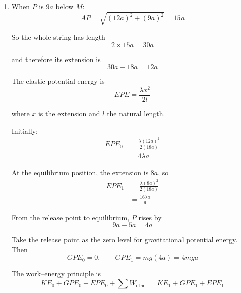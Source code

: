 \documentclass[leqno]{article}
\begin{document}
\begin{enumerate}[
  label=\textbf{\arabic*.},
  leftmargin=*,
  topsep=0pt,
  partopsep=0pt,
  parsep=0pt
]
\begin{djsSolution}
\begin{enumerate}[label=\textbf{(\alph*)}, start=1]
so
\[
AP=\sqrt{(12a)^2+(5a)^2}=13a
\]

Hence the actual length of the whole string is
\[
2\times 13a=26a
\]

so its extension is
\[
26a-18a=8a
\]

The tension is
\[
T=\frac{\lambda x}{l}
\]

where \(x\) is the extension and \(l\) the natural length. The tension \(T\) is the same in each side, and here \(x=8a\) and \(l=18a\), so
\[
T=\frac{\lambda(8a)}{18a}=\frac{4\lambda}{9}
\]

If $\theta$ is the angle each side makes with the horizontal, then from the $5$-$12$-$13$ triangle:
\[
\sin\theta=\frac{5}{13}
\]

Resolving vertically for equilibrium:
\begin{align*}
2T\sin\theta&=mg\\
2\left(\frac{4\lambda}{9}\right)\left(\frac{5}{13}\right)&=mg\\
\frac{40\lambda}{117}&=mg
\end{align*}

Therefore
\[
\lambda=\frac{117mg}{40}
\]


  \item When $P$ is $9a$ below $M$:
\[
AP=\sqrt{(12a)^2+(9a)^2}=15a
\]

So the whole string has length
\[
2\times 15a=30a
\]

and therefore its extension is
\[
30a-18a=12a
\]

The elastic potential energy is
\[
EPE=\frac{\lambda x^2}{2l}
\]

where \(x\) is the extension and \(l\) the natural length.

Initially:
\begin{align*}
EPE_0&=\frac{\lambda(12a)^2}{2(18a)}\\
&=4\lambda a
\end{align*}

At the equilibrium position, the extension is $8a$, so
\begin{align*}
EPE_1&=\frac{\lambda(8a)^2}{2(18a)}\\
&=\frac{16\lambda a}{9}
\end{align*}

From the release point to equilibrium, $P$ rises by
\[
9a-5a=4a
\]

Take the release point as the zero level for gravitational potential energy. Then
\[
GPE_0=0,\qquad GPE_1=mg(4a)=4mga
\]

The work--energy principle is
\[
KE_0+GPE_0+EPE_0+\sum W_{\text{other}}=KE_1+GPE_1+EPE_1
\]


\end{enumerate}
\end{djsSolution}
\end{enumerate}
\end{document}
